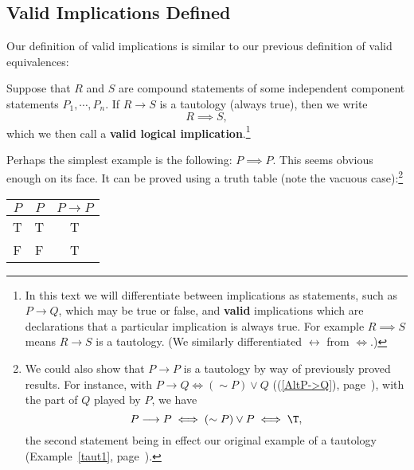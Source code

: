 \subsection{Valid Implications Defined}
Our definition of valid implications is similar to our previous
definition of valid equivalences:
\begin{definition} Suppose that $R$ and $S$ are compound
statements of some independent component statements $P_1,\cdots,P_n$.
If  $R\longrightarrow S$ is a tautology (always true),
then we write 
\begin{equation}R\implies S,\end{equation}
which we then call a 
{\bf valid logical
implication}.\footnote{%
In this text we will differentiate between implications
as statements, such as $P\longrightarrow Q$, which may be 
true or false, and {\bf valid} implications which are
declarations that a particular implication is always true.
For example
$R\implies S$ means $R\longrightarrow S$
is a tautology.  (We similarly differentiated $\longleftrightarrow$
from $\iff$.)
}
\end{definition}
\bex
Perhaps the simplest example is the following:
$P\implies P.$
This seems obvious enough on its face.  
It can be proved using a truth table (note the vacuous case):\footnote{%
 We could also show that $P\longrightarrow P$ is
a tautology by way of previously proved results.
For instance, with $P\longrightarrow Q\iff(\sim P)\vee Q$
((\ref{AltP->Q}), page~\pageref{AltP->Q}), with 
the part of $Q$ played by $P$, we have
$$P\longrightarrow P\iff (\sim P)\vee P\iff\T,$$
the second statement being in effect our original example of a tautology
(Example~\ref{taut1}, page~\pageref{taut1}).%
}
\begin{center}
\begin{tabular}{|c||c|c|}
\hline
$P$ &$P$& $P\longrightarrow P$ \\
\hline
T&T&T\\ F&F&T\\
\hline\end{tabular}
\end{center}

\noindent
\eex

